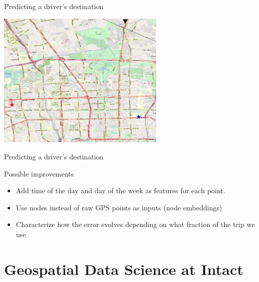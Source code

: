 \documentclass[aspectratio=169]{beamer}
\begin{document}
\begin{frame}{Predicting a driver's destination}
\centering

\includegraphics[width=0.6\textwidth]{figures/ex4_clf}
\end{frame}

\begin{frame}{Predicting a driver's destination}

{\Large Possible improvements}

\vspace{.5cm}
\begin{itemize}
	\item Add time of the day and day of the week as features for each point.
	\item Use nodes instead of raw GPS points as inputs (node embeddings)
	\item Characterize how the error evolves depending on what fraction of the trip we use
\end{itemize}

\end{frame}


\section{Geospatial Data Science at Intact}
\end{document}
